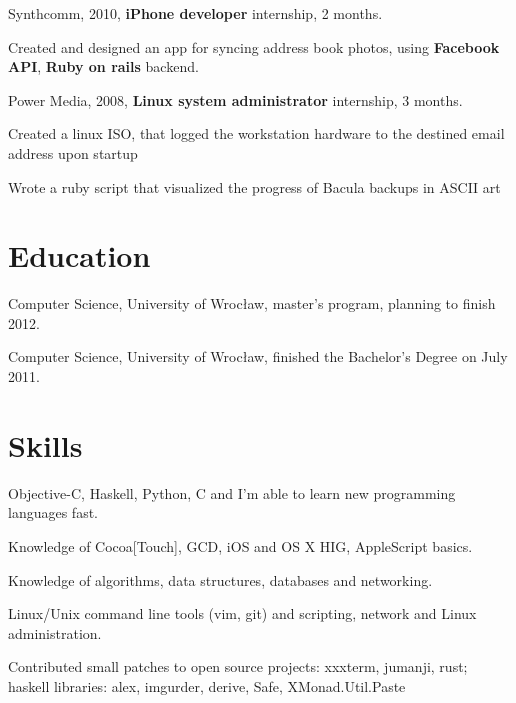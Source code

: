 \documentclass[letterpaper]{article}
\renewenvironment{itemize}{
  \begin{list}{}{
    \setlength{\leftmargin}{1.5em}
  }
}{
  \end{list}
}
\begin{document}
\begin{itemize}
	\item Synthcomm, 2010, {\bf iPhone developer} internship, 2 months.
		\begin{itemize}

			\item Created and designed an app for syncing address book photos,
                using {\bf Facebook API}, {\bf Ruby on rails} backend.

		\end{itemize}

	\item Power Media, 2008, {\bf Linux system administrator} internship, 3 months.
	    \begin{itemize}

		\item Created a linux ISO, that logged the workstation hardware to the destined email address upon startup

		\item Wrote a ruby script that visualized the progress of Bacula backups in ASCII art

	    \end{itemize}
\end{itemize}

\section*{Education}

\begin{itemize}
  	\item Computer Science, University of Wrocław, master's program, planning to finish 2012.
  	\item Computer Science, University of Wrocław, finished the Bachelor's Degree on July 2011.
\end{itemize}

\section*{Skills}

\begin{itemize}
	\item Objective-C, Haskell, Python, C and I'm able to learn new programming languages fast.
	\item Knowledge of Cocoa[Touch], GCD, iOS and OS X HIG, AppleScript basics.
	\item Knowledge of algorithms, data structures, databases and networking.
    \item Linux/Unix command line tools (vim, git) and scripting, network and Linux administration.
	\item Contributed small patches to open source projects: xxxterm, jumanji, rust;\\
		 haskell libraries: alex, imgurder, derive, Safe, XMonad.Util.Paste
\end{itemize}
\end{document}
